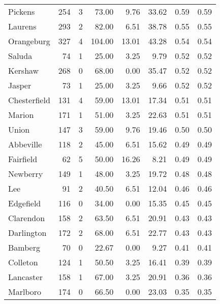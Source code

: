 \begin{tabular}{lrrrrrrr}
     Pickens &   254 &      3 &  73.00 &       9.76 &     33.62 &         0.59 &      0.59 \\
     Laurens &   293 &      2 &  82.00 &       6.51 &     38.78 &         0.55 &      0.55 \\
  Orangeburg &   327 &      4 & 104.00 &      13.01 &     43.28 &         0.54 &      0.54 \\
      Saluda &    74 &      1 &  25.00 &       3.25 &      9.79 &         0.52 &      0.52 \\
     Kershaw &   268 &      0 &  68.00 &       0.00 &     35.47 &         0.52 &      0.52 \\
      Jasper &    73 &      1 &  25.00 &       3.25 &      9.66 &         0.52 &      0.52 \\
Chesterfield &   131 &      4 &  59.00 &      13.01 &     17.34 &         0.51 &      0.51 \\
      Marion &   171 &      1 &  51.00 &       3.25 &     22.63 &         0.51 &      0.51 \\
       Union &   147 &      3 &  59.00 &       9.76 &     19.46 &         0.50 &      0.50 \\
   Abbeville &   118 &      2 &  45.00 &       6.51 &     15.62 &         0.49 &      0.49 \\
   Fairfield &    62 &      5 &  50.00 &      16.26 &      8.21 &         0.49 &      0.49 \\
    Newberry &   149 &      1 &  48.00 &       3.25 &     19.72 &         0.48 &      0.48 \\
         Lee &    91 &      2 &  40.50 &       6.51 &     12.04 &         0.46 &      0.46 \\
   Edgefield &   116 &      0 &  34.00 &       0.00 &     15.35 &         0.45 &      0.45 \\
   Clarendon &   158 &      2 &  63.50 &       6.51 &     20.91 &         0.43 &      0.43 \\
  Darlington &   172 &      2 &  68.00 &       6.51 &     22.77 &         0.43 &      0.43 \\
     Bamberg &    70 &      0 &  22.67 &       0.00 &      9.27 &         0.41 &      0.41 \\
    Colleton &   124 &      1 &  50.50 &       3.25 &     16.41 &         0.39 &      0.39 \\
   Lancaster &   158 &      1 &  67.00 &       3.25 &     20.91 &         0.36 &      0.36 \\
    Marlboro &   174 &      0 &  66.50 &       0.00 &     23.03 &         0.35 &      0.35 \\

\end{tabular}
